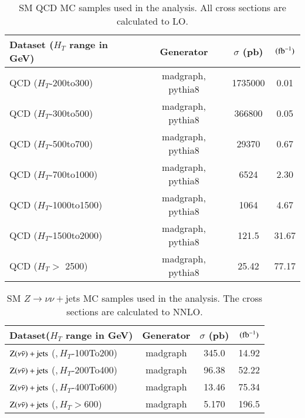 \begin{table}[h]
\centering
\caption{SM QCD MC samples used in the analysis. All cross
  sections are calculated to LO.}
\label{tab:qcdMCsamples}
{\footnotesize
\begin{tabular}{lccc}
\hline \hline
Dataset ($H_{T}$ range in GeV) &Generator & $\sigma$ (pb) & $ (\rm fb^{-1}) $\\
\hline
QCD ($H_{T}$-200to300) & madgraph, pythia8 & 1735000 & 0.01\\
QCD ($H_{T}$-300to500) & madgraph, pythia8 & 366800 & 0.05\\
QCD ($H_{T}$-500to700) & madgraph, pythia8 & 29370 & 0.67\\
QCD ($H_{T}$-700to1000) & madgraph, pythia8 & 6524 & 2.30\\
QCD ($H_{T}$-1000to1500) & madgraph, pythia8 & 1064 & 4.67\\
QCD ($H_{T}$-1500to2000) & madgraph, pythia8 & 121.5 & 31.67\\
QCD ($H_{T}>$ 2500) & madgraph, pythia8 & 25.42 & 77.17\\
\hline \hline
\end{tabular}
}
\end{table}


\begin{table}[h]
\centering
\caption{SM $Z\rightarrow\nu\nu+$jets MC samples used in the analysis. The cross
  sections are calculated to NNLO. }
\label{tab:zjetsMCsamples}
{\footnotesize
\begin{tabular}{lccc}
\hline \hline
Dataset($H_{T}$ range in GeV) & Generator & $\sigma$ (pb) & $ (\rm fb^{-1})$ \\
\hline
$\rm Z(\nu \bar{\nu})+jets$  ($ ,H_{T}$-100To200) & madgraph & 345.0 & 14.92\\
$\rm Z(\nu \bar{\nu})+jets$  ($ ,H_{T}$-200To400) & madgraph & 96.38 & 52.22\\
$\rm Z(\nu \bar{\nu})+jets$  ($ ,H_{T}$-400To600) & madgraph & 13.46 & 75.34\\
$\rm Z(\nu \bar{\nu})+jets$  ($ ,H_{T} > $600) & madgraph & 5.170 & 196.5\\
\hline \hline
\end{tabular}
}
\end{table}

